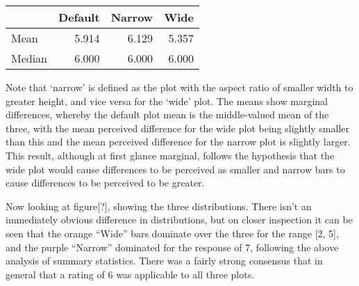 \documentclass[
]{article}
\newenvironment{Shaded}{\begin{snugshade}}{\end{snugshade}}
\newcommand{\DataTypeTok}[1]{\textcolor[rgb]{0.13,0.29,0.53}{#1}}
\newcommand{\DecValTok}[1]{\textcolor[rgb]{0.00,0.00,0.81}{#1}}
\newcommand{\KeywordTok}[1]{\textcolor[rgb]{0.13,0.29,0.53}{\textbf{#1}}}
\newcommand{\NormalTok}[1]{#1}
\newcommand{\OperatorTok}[1]{\textcolor[rgb]{0.81,0.36,0.00}{\textbf{#1}}}
\newcommand{\StringTok}[1]{\textcolor[rgb]{0.31,0.60,0.02}{#1}}
\begin{document}
\begin{Shaded}
\end{Shaded}

\begin{table}[!h]
\centering
\begin{tabular}{l|r|r|r}
\hline
  & Default & Narrow & Wide\\
\hline
Mean & 5.914 & 6.129 & 5.357\\
\hline
Median & 6.000 & 6.000 & 6.000\\
\hline
\end{tabular}
\end{table}

Note that `narrow' is defined as the plot with the aspect ratio of
smaller width to greater height, and vice versa for the `wide' plot. The
means show marginal differences, whereby the default plot mean is the
middle-valued mean of the three, with the mean perceived difference for
the wide plot being slightly smaller than this and the mean perceived
difference for the narrow plot is slightly larger. This result, although
at first glance marginal, follows the hypothesis that the wide plot
would cause differences to be perceived as smaller and narrow bars to
cause differences to be perceived to be greater.

Now looking at figure{[}?{]}, showing the three distributions. There
isn't an immediately obvious difference in distributions, but on closer
inspection it can be seen that the orange ``Wide'' bars dominate over
the three for the range {[}2, 5{]}, and the purple ``Narrow'' dominated
for the response of 7, following the above analysis of summary
statistics. There was a fairly strong consensus that in general that a
rating of 6 was applicable to all three plots.
\end{document}
